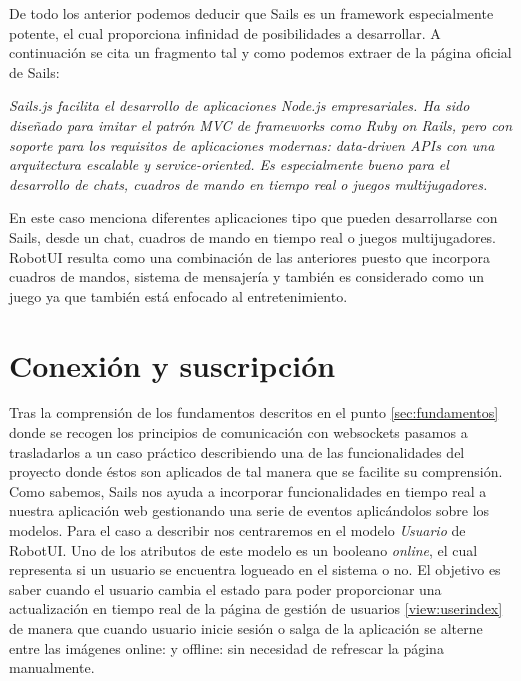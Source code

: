 De todo los anterior podemos deducir que Sails es un framework especialmente potente, el cual proporciona infinidad de posibilidades a desarrollar. A continuación se cita un fragmento tal y 
como podemos extraer de la página oficial de Sails:\\

\begin{center}
\emph{Sails.js facilita el desarrollo de aplicaciones Node.js empresariales. Ha sido diseñado para imitar el patrón MVC de frameworks como Ruby on Rails, pero con soporte para los requisitos de aplicaciones modernas: data-driven APIs con una arquitectura escalable y service-oriented. Es especialmente bueno para el desarrollo de chats, cuadros de mando en tiempo real o juegos multijugadores.} 
\end{center}


En este caso menciona diferentes aplicaciones tipo que pueden desarrollarse con Sails, desde un chat, cuadros de mando en tiempo real o juegos multijugadores. RobotUI resulta como una combinación de las 
anteriores puesto que incorpora cuadros de mandos, sistema de mensajería y también es considerado como un juego ya que también está enfocado al entretenimiento.\\


\section{ Conexión y suscripción }
\label{sec:comunicaciones-robotui}

Tras la comprensión de los fundamentos descritos en el punto \ref{sec:fundamentos} donde se recogen los principios de comunicación con websockets pasamos
a trasladarlos a un caso práctico describiendo una de las funcionalidades del proyecto donde éstos son aplicados de tal manera que se facilite su comprensión.\\

Como sabemos, Sails nos ayuda a incorporar funcionalidades en tiempo real a nuestra aplicación web gestionando una serie de eventos aplicándolos sobre los modelos. Para el caso a describir nos
centraremos en el modelo \emph{Usuario} de RobotUI. Uno de los atributos de este modelo es un booleano \emph{online}, el cual representa si un usuario se encuentra logueado en el sistema o no.
El objetivo es saber cuando el usuario cambia el estado para poder proporcionar una actualización en tiempo real de la página de gestión de usuarios \ref{view:userindex} de manera que cuando usuario
inicie sesión o salga de la aplicación se alterne entre las imágenes online:  y offline:  sin necesidad de refrescar la página manualmente.\\


